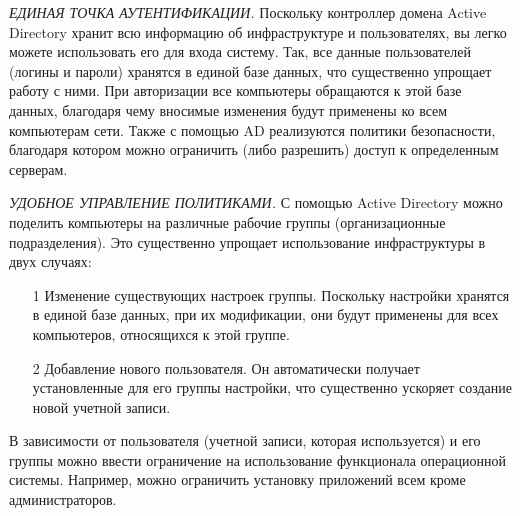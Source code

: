 \textit{ЕДИНАЯ ТОЧКА АУТЕНТИФИКАЦИИ.}
Поскольку контроллер домена Active Directory хранит всю информацию об инфраструктуре и пользователях, вы легко можете использовать его для входа систему. Так, все данные пользователей (логины и пароли) хранятся в единой базе данных, что существенно упрощает работу с ними. При авторизации все компьютеры обращаются к этой базе данных, благодаря чему вносимые изменения будут применены ко всем компьютерам сети.  Также с помощью AD реализуются политики безопасности, благодаря котором можно ограничить (либо разрешить) доступ к определенным серверам.

\textit{УДОБНОЕ УПРАВЛЕНИЕ ПОЛИТИКАМИ.}
С помощью Active Directory можно поделить компьютеры на различные рабочие группы (организационные подразделения). Это существенно упрощает использование инфраструктуры в двух случаях:
\begin{enumerate}
    \item[1] Изменение существующих настроек группы. Поскольку настройки хранятся в единой базе данных, при их модификации, они будут применены для всех компьютеров, относящихся к этой группе.
    \item[2] Добавление нового пользователя. Он автоматически получает установленные для его группы настройки, что существенно ускоряет создание новой учетной записи.
\end{enumerate}

В зависимости от пользователя (учетной записи, которая используется) и его группы можно ввести ограничение на использование функционала операционной системы. Например, можно ограничить установку приложений всем кроме администраторов.

